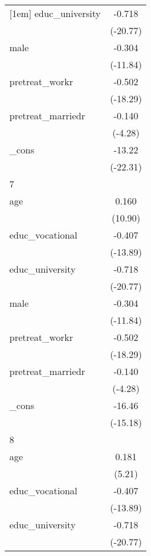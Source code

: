 {\begin{tabular}{l*{1}{c}}
[1em]
educ\_university&      -0.718\sym{***}\\
            &    (-20.77)         \\
[1em]
male        &      -0.304\sym{***}\\
            &    (-11.84)         \\
[1em]
pretreat\_workr&      -0.502\sym{***}\\
            &    (-18.29)         \\
[1em]
pretreat\_marriedr&      -0.140\sym{***}\\
            &     (-4.28)         \\
[1em]
\_cons      &      -13.22\sym{***}\\
            &    (-22.31)         \\
\hline
7           &                     \\
age         &       0.160\sym{***}\\
            &     (10.90)         \\
[1em]
educ\_vocational&      -0.407\sym{***}\\
            &    (-13.89)         \\
[1em]
educ\_university&      -0.718\sym{***}\\
            &    (-20.77)         \\
[1em]
male        &      -0.304\sym{***}\\
            &    (-11.84)         \\
[1em]
pretreat\_workr&      -0.502\sym{***}\\
            &    (-18.29)         \\
[1em]
pretreat\_marriedr&      -0.140\sym{***}\\
            &     (-4.28)         \\
[1em]
\_cons      &      -16.46\sym{***}\\
            &    (-15.18)         \\
\hline
8           &                     \\
age         &       0.181\sym{***}\\
            &      (5.21)         \\
[1em]
educ\_vocational&      -0.407\sym{***}\\
            &    (-13.89)         \\
[1em]
educ\_university&      -0.718\sym{***}\\
            &    (-20.77)         \\
[1em]

\end{tabular}}

